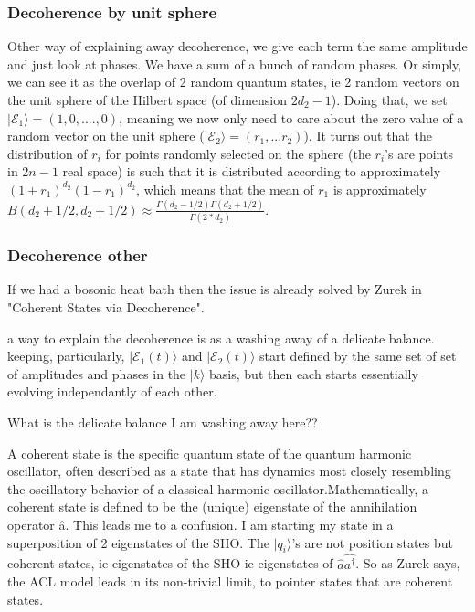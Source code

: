 \documentclass{article}
\begin{document}
\subsubsection{Decoherence by unit sphere}
Other way of explaining away decoherence, we give each term the same amplitude and just look at phases. We have a sum of a bunch of random phases. Or simply, we can see it as the overlap of 2 random quantum states, ie 2 random vectors on the unit sphere of the Hilbert space (of dimension $2d_2-1$). Doing that, we set $|\mathcal{E}_1\rangle=(1,0,....,0)$, meaning we now only need to care about the zero value of a random vector on the unit sphere ($|\mathcal{E}_2\rangle=(r_1, ...r_2)$). It turns out that the distribution of $r_i$ for points randomly selected on the sphere (the $r_i$'s are points in $2n-1$ real space) is such that it is distributed according to approximately $(1+r_1)^{d_2}(1-r_1)^{d_2}$, which means that the mean of $r_1$ is approximately $B(d_2+1/2,d_2+1/2)\approx\frac{\Gamma(d_2-1/2)\Gamma(d_2+1/2)}{\Gamma(2*d_2)}$.


\subsubsection{Decoherence other}
If we had a bosonic heat bath then the issue is already solved by Zurek in "Coherent States via Decoherence". 
\begin{comment}
We find pointer states $|q_1\rangle = (\hat{a}^{\dagger})^{q_1}|0\rangle$, not a coherent state/  Note that this goes against what Andreas is saying, which is that we have position eigenstaes as pointer states, which would be $b(\hat{a}^{\dagger}+\hat{a})$. ( Zurek's paper Coherent States via Decoherence) (does my paper go against this?). 
\end{comment}



a way to explain the decoherence is as a washing away of a delicate balance.
keeping, particularly, $|\mathcal{E}_1(t)\rangle$ and $|\mathcal{E}_2(t)\rangle$ start defined by the same set of set of amplitudes and phases in the $|k\rangle$ basis, but then each starts essentially evolving independantly of each other.




What is the delicate balance I am washing away here??

A coherent state is the specific quantum state of the quantum harmonic oscillator, often described as a state that has dynamics most closely resembling the oscillatory behavior of a classical harmonic oscillator.Mathematically, a coherent state is defined to be the (unique) eigenstate of the annihilation operator â.
This leads me to a confusion. I am starting my state in a superposition of 2 eigenstates of the SHO. The $|q_i\rangle$'s are not position states but coherent states, ie eigenstates of the SHO ie eigenstates of $\hat{a}\hat{a^{\dagger}}$. So as Zurek says, the ACL model leads in its non-trivial limit, to pointer states that are coherent states.
\end{document}
